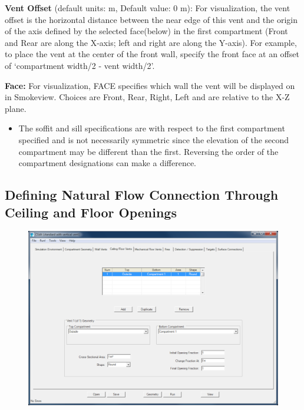 \textbf{Vent Offset} (default units: m, Default value: 0 m): For visualization, the vent offset is the horizontal distance between the near edge of this vent and the origin of the axis defined by the selected face(below) in the first compartment (Front and Rear are along the X-axis; left and right are along the Y-axis). For example, to place the vent at the center of the front wall, specify the front face at an offset of `compartment width/2 - vent width/2'.

\textbf{Face:} For visualization, FACE specifies which wall the vent will be displayed on in Smokeview.  Choices are Front, Rear, Right, Left and are relative to the X-Z plane.

\begin{itemize}
\item The soffit and sill specifications are with respect to the first compartment specified and is not necessarily symmetric since the elevation of the second compartment may be different than the first.  Reversing the order of the compartment designations can make a difference.
\end{itemize}

\subsection{Defining Natural Flow Connection Through Ceiling and Floor Openings}

\begin{figure}[h!]
\includegraphics[width=6.5in]{FIGURES/Input_File/Vertical_Flow_Tab}
\end{figure}

